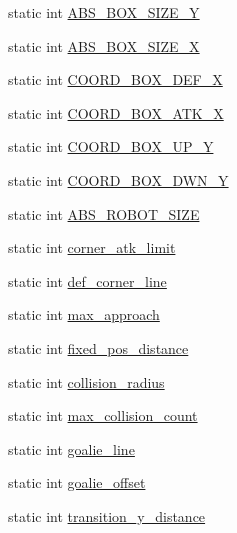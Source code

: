 \begin{DoxyCompactItemize}
\item 
static int \hyperlink{namespace_c_o_n_s_t_a90910fad6734057eeb76ae1f44eadfd8}{A\+B\+S\+\_\+\+B\+O\+X\+\_\+\+S\+I\+Z\+E\+\_\+Y}
\item 
static int \hyperlink{namespace_c_o_n_s_t_a181907129f9dadbae4c4f05af8bd5e8f}{A\+B\+S\+\_\+\+B\+O\+X\+\_\+\+S\+I\+Z\+E\+\_\+X}
\item 
static int \hyperlink{namespace_c_o_n_s_t_a7d27201b3e7475f3c8141242fa75a026}{C\+O\+O\+R\+D\+\_\+\+B\+O\+X\+\_\+\+D\+E\+F\+\_\+X}
\item 
static int \hyperlink{namespace_c_o_n_s_t_a18d16256fcefad7961c73c9546127750}{C\+O\+O\+R\+D\+\_\+\+B\+O\+X\+\_\+\+A\+T\+K\+\_\+X}
\item 
static int \hyperlink{namespace_c_o_n_s_t_a5183cf5159cdc31e5b55d6d97d0854e4}{C\+O\+O\+R\+D\+\_\+\+B\+O\+X\+\_\+\+U\+P\+\_\+Y}
\item 
static int \hyperlink{namespace_c_o_n_s_t_ae8aee80eeed2ae4a828ac666631db4d3}{C\+O\+O\+R\+D\+\_\+\+B\+O\+X\+\_\+\+D\+W\+N\+\_\+Y}
\item 
static int \hyperlink{namespace_c_o_n_s_t_a8d0d7fe4341b9129cabd565ef16a0640}{A\+B\+S\+\_\+\+R\+O\+B\+O\+T\+\_\+\+S\+I\+ZE}
\item 
static int \hyperlink{namespace_c_o_n_s_t_a2dae2bbcbbd0735ad1544509929d1c8f}{corner\+\_\+atk\+\_\+limit}
\item 
static int \hyperlink{namespace_c_o_n_s_t_a1ceb4c2871b41b2f17d5bff1e40e9dd0}{def\+\_\+corner\+\_\+line}
\item 
static int \hyperlink{namespace_c_o_n_s_t_ae2d0cdffa1b71008198e4f7455a5d17e}{max\+\_\+approach}
\item 
static int \hyperlink{namespace_c_o_n_s_t_ae8d764cbcf03a0351752bff7d9cb30e6}{fixed\+\_\+pos\+\_\+distance}
\item 
static int \hyperlink{namespace_c_o_n_s_t_a793c8da95030a92162ffac2d4dbe7a27}{collision\+\_\+radius}
\item 
static int \hyperlink{namespace_c_o_n_s_t_ac842498e6a58e8876f03a854fc407ca4}{max\+\_\+collision\+\_\+count}
\item 
static int \hyperlink{namespace_c_o_n_s_t_a0091cb614eeaed41acd8997e9f9c9c0c}{goalie\+\_\+line}
\item 
static int \hyperlink{namespace_c_o_n_s_t_a75c38666c7edbca23d10a3fc651865a4}{goalie\+\_\+offset}
\item 
static int \hyperlink{namespace_c_o_n_s_t_a80cf517751f39b73463d8dbe63458266}{transition\+\_\+y\+\_\+distance}
\end{DoxyCompactItemize}


